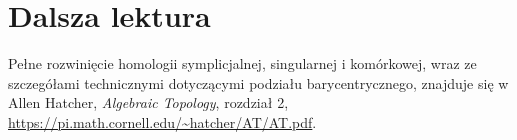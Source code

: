 \section*{Dalsza lektura}
Pełne rozwinięcie homologii symplicjalnej,
singularnej i komórkowej, wraz ze
szczegółami technicznymi dotyczącymi
podziału barycentrycznego, znajduje się
w Allen Hatcher,
\emph{Algebraic Topology}, rozdział 2,
\url{https://pi.math.cornell.edu/~hatcher/AT/AT.pdf}.
\clearpage

